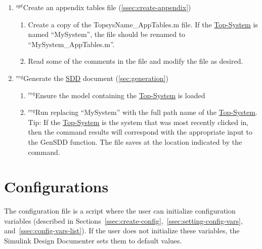 \documentclass{mcscert}
\newcommand{\sddtool}{Simulink Design Documenter}
\newcommand{\topsystemnolink}{Top-System} %
\newcommand{\topsystem}{\hyperref[def:topsystem]{\topsystemnolink{}}}
\begin{document}
\begin{enumerate}


	\item $^{opt}$Create an appendix tables file (\hyperref[ssec:create-appendix]{\ref*{ssec:create-appendix}})
	\begin{enumerate}
		\item Create a copy of the TopsysName\_AppTables.m file. 
		If the \topsystem{} is named ``MySystem'', the file should be renamed to ``MySystem\_AppTables.m''.
		\item Read some of the comments in the file and modify the file as desired.
	\end{enumerate}
	\item $^{req}$Generate the \hyperref[acr:sdd]{SDD} document (\hyperref[sec:generation]{\ref*{sec:generation}})
	\begin{enumerate}
		\item $^{req}$Ensure the model containing the \topsystem{} is loaded
		\item $^{req}$Run  replacing ``MySystem'' with the full path name of the \topsystem{}. 
		Tip: If the \topsystem{} is the \simulink{} system that was most recently clicked in, then the  command results will correspond with the appropriate input to the GenSDD function. 
		The file saves at the location indicated by the  command.
	\end{enumerate}
\end{enumerate}
    
\section{Configurations} 
\label{sec:configurations}
The configuration file is a \matlab{} script where the user can initialize configuration variables (described in Sections~\ref{ssec:create-config},~\ref{ssec:setting-config-vars}, and~\ref{ssec:config-vars-list}). 
If the user does not initialize these variables, the \sddtool{} sets them to default values.
  
\end{document}
